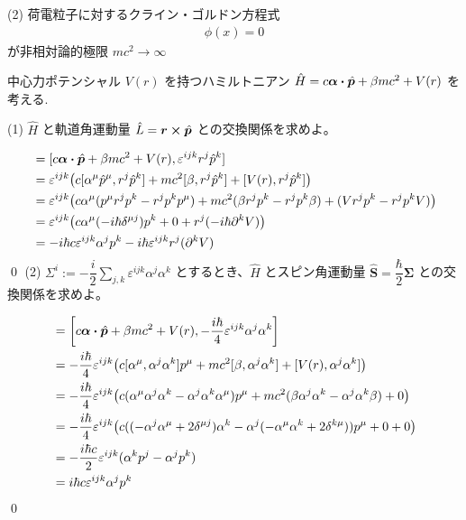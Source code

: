 \documentclass[uplatex,dvipdfmx,a4paper,11pt]{jlreq}
\makeatletter
\newcommand{\rr}{\bm{r}}
\newcommand{\pp}{\bm{p}}
\theoremstyle{definition}
\renewenvironment{proof}[1][\proofname]{\par
  \normalfont
  \topsep6\p@\@plus6\p@ \trivlist
  \item[\hskip\labelsep{\bfseries #1}\@addpunct{\bfseries}]\ignorespaces\quad\par
}{%
  \qed\endtrivlist\@endpefalse
}
\renewcommand\proofname{証明}
\makeatother
\begin{document}
(2) 荷電粒子に対するクライン・ゴルドン方程式
\begin{align}
  [\hbar^2D^2 + (mc)^2]\phi(x) = 0
\end{align}
が非相対論的極限 $mc^2\to\infty$

\begin{problem}
中心力ポテンシャル $V(r)$ を持つハミルトニアン $\hat{H} = c\bm{\alpha}\vdot\hat{\pp} + \beta mc^2 + V(r)$ を考える.
\end{problem}
(1) $\hat{H}$ と軌道角運動量 $\hat{L} = \rr\cross\hat{\pp}$ との交換関係を求めよ。
\begin{proof}
  \begin{align}
    [\hat{H}, \hat{L}^i] & = [c\bm{\alpha}\vdot\hat{\pp} + \beta mc^2 + V(r), \varepsilon^{ijk}r^j\hat{p}^k]                                         \\
                         & = \varepsilon^{ijk}\qty(c[\alpha^\mu\hat{p}^\mu, r^j\hat{p}^k] + mc^2[\beta, r^j\hat{p}^k] + [V(r), r^j\hat{p}^k])        \\
                         & = \varepsilon^{ijk}\qty(c\alpha^\mu(p^\mu r^jp^k - r^jp^kp^\mu) + mc^2(\beta r^jp^k - r^jp^k\beta) + (Vr^jp^k - r^jp^kV)) \\
                         & = \varepsilon^{ijk}\qty(c\alpha^\mu (-i\hbar\delta^{\mu j})p^k + 0 + r^j(-i\hbar\partial^kV))                             \\
                         & = -i\hbar c\varepsilon^{ijk}\alpha^jp^k - i\hbar\varepsilon^{ijk}r^j(\partial^kV)
  \end{align}
\end{proof}
(2) $\Sigma^i := -\dfrac{i}{2}\sum_{j,k}\varepsilon^{ijk}\alpha^j\alpha^k$ とするとき、$\hat{H}$ とスピン角運動量 $\hat{\bm{S}} = \dfrac{\hbar}{2}\bm{\Sigma}$ との交換関係を求めよ。
\begin{proof}
  \begin{align}
    [\hat{H}, \hat{S}^i] & = \qty[c\bm{\alpha}\vdot\hat{\pp} + \beta mc^2 + V(r), -\frac{i\hbar}{4}\varepsilon^{ijk}\alpha^j\alpha^k]                                                          \\
                         & = -\frac{i\hbar}{4}\varepsilon^{ijk}\qty(c[\alpha^\mu, \alpha^j\alpha^k]p^\mu + mc^2[\beta, \alpha^j\alpha^k] + [V(r), \alpha^j\alpha^k])                           \\
                         & = -\frac{i\hbar}{4}\varepsilon^{ijk}\qty(c(\alpha^\mu\alpha^j\alpha^k - \alpha^j\alpha^k\alpha^\mu)p^\mu + mc^2(\beta\alpha^j\alpha^k - \alpha^j\alpha^k\beta) + 0) \\
                         & = -\frac{i\hbar}{4}\varepsilon^{ijk}\qty(c((-\alpha^j\alpha^\mu + 2\delta^{\mu j})\alpha^k - \alpha^j(-\alpha^\mu\alpha^k + 2\delta^{k\mu}))p^\mu + 0 + 0)          \\
                         & = -\frac{i\hbar c}{2}\varepsilon^{ijk}(\alpha^kp^j - \alpha^jp^k)                                                                                                   \\
                         & = i\hbar c\varepsilon^{ijk}\alpha^jp^k
  \end{align}
\end{proof}
\end{document}

